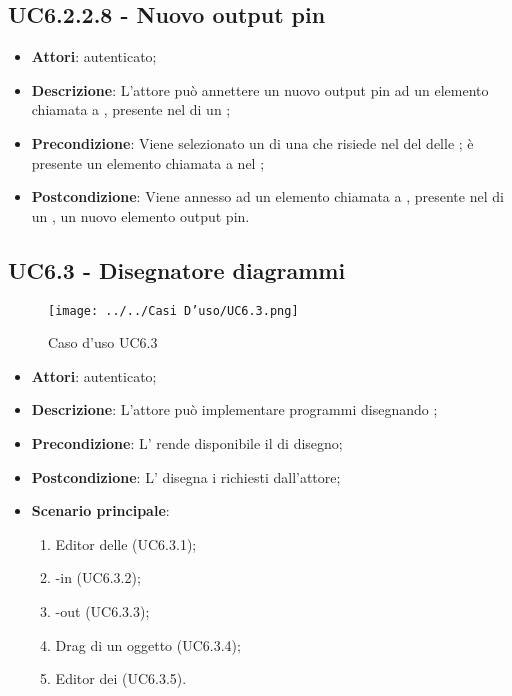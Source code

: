 \subsection{UC6.2.2.8 - Nuovo output pin}
\label{ssec:UC6.2.2.8}
\begin{itemize}
\item \textbf{Attori}:  autenticato;
\item \textbf{Descrizione}: L'attore può annettere un nuovo output pin ad un elemento chiamata a , presente nel  di un ;
\item \textbf{Precondizione}: Viene selezionato un  di una  che risiede nel  del  delle  ; è presente un elemento chiamata a  nel ;
\item \textbf{Postcondizione}: Viene annesso ad un elemento chiamata a , presente nel  di un , un nuovo elemento output pin.
\end{itemize}
\newpage
\subsection{UC6.3 - Disegnatore diagrammi}
\label{ssec:UC6.3}
\begin{figure}[h!]
\centering
\texttt{[image: ../../Casi D'uso/UC6.3.png]}
\caption{Caso d'uso UC6.3}
 \end{figure}
\begin{itemize}
\item \textbf{Attori}:  autenticato;
\item \textbf{Descrizione}: L'attore può implementare programmi disegnando ;
\item \textbf{Precondizione}: L' rende disponibile il  di disegno;
\item \textbf{Postcondizione}: L' disegna i  richiesti dall'attore;
\item \textbf{Scenario principale}: \begin{enumerate}\item Editor  delle  (UC6.3.1);\item {}-in (UC6.3.2);\item {}-out (UC6.3.3);\item Drag di un oggetto (UC6.3.4);\item Editor  dei  (UC6.3.5).
 \end{enumerate}
\end{itemize}
\newpage

